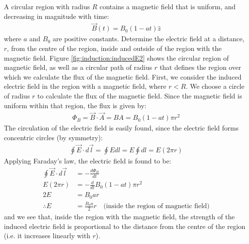 \begin{example}{A circular region with radius $R$ contains a magnetic field that is uniform, and decreasing in magnitude with time:
\begin{align*}
\vec B(t) = B_0(1-at)\hat z
\end{align*}
where $a$ and $B_0$ are positive constants. Determine the electric field at a distance, $r$, from the centre of the region, inside and outside of the region with the magnetic field.}
Figure \ref{fig:induction:inducedE2} shows the circular region of magnetic field, as well as a circular path of radius $r$ that defines the region over which we calculate the flux of the magnetic field.
First, we consider the induced electric field in the region with a magnetic field, where $r<R$. We choose a circle of radius $r$ to calculate the flux of the magnetic field. Since the magnetic field is uniform within that region, the flux is given by:
\begin{align*}
\Phi_B = \vec B \cdot \vec A = BA = B_0(1-at) \pi r^2
\end{align*}
The circulation of the electric field is easily found, since the electric field forms concentric circles (by symmetry):
\begin{align*}
\oint \vec E \cdot d\vec l = \oint Edl = E \oint dl = E(2\pi r)
\end{align*}
Applying Faraday's law, the electric field is found to be:
\begin{align*}
\oint \vec E\cdot d\vec l &= -\frac{d\Phi_B}{dt}\\
E(2\pi r) &= -\frac{d}{dt} B_0(1-at) \pi r^2\\
2E &=  B_0ar\\
\therefore E&=\frac{B_0a}{2}r\quad\text{(inside the region of magnetic field)}
\end{align*}
and we see that, inside the region with the magnetic field, the strength of the induced electric field is proportional to the distance from the centre of the region (i.e. it increases linearly with $r$). 


\end{example}
